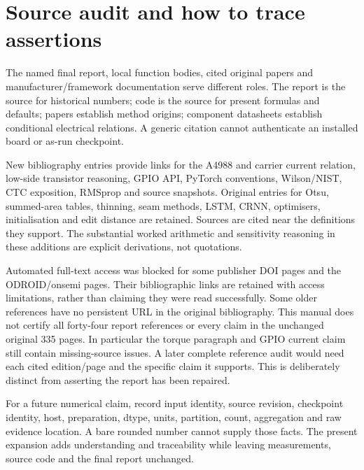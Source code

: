 \section{Source audit and how to trace assertions}
\label{sec:source-audit}
The named final report, local function bodies, cited original papers and
manufacturer/framework documentation serve different roles. The report is
the source for historical numbers; code is the source for present formulas
and defaults; papers establish method origins; component datasheets establish
conditional electrical relations. A generic citation cannot authenticate an
installed board or as-run checkpoint.

New bibliography entries provide links for the A4988 and carrier current
relation, low-side transistor reasoning, GPIO API, PyTorch conventions,
Wilson/NIST, CTC exposition, RMSprop and source snapshots. Original entries
for Otsu, summed-area tables, thinning, seam methods, LSTM, CRNN, optimisers,
initialisation and edit distance are retained. Sources are cited near the
definitions they support. The substantial worked arithmetic and sensitivity
reasoning in these additions are explicit derivations, not quotations.

Automated full-text access was blocked for some publisher DOI pages and
the ODROID/onsemi pages. Their bibliographic links are retained with access
limitations, rather than claiming they were read successfully. Some older
references have no persistent URL in the original bibliography. This manual
does not certify all forty-four report references or every claim in the
unchanged original 335 pages. In particular the torque paragraph and GPIO
current claim still contain missing-source issues. A later complete reference
audit would need each cited edition/page and the specific claim it supports.
This is deliberately distinct from asserting the report has been repaired.

For a future numerical claim, record input identity, source revision,
checkpoint identity, host, preparation, dtype, units, partition, count,
aggregation and raw evidence location. A bare rounded number cannot supply
those facts. The present expansion adds understanding and traceability while
leaving measurements, source code and the final report unchanged.

